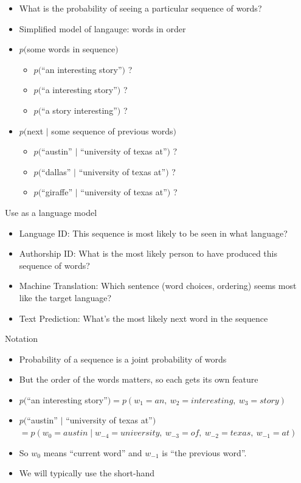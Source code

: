 \documentclass[11pt,letterpaper]{article}
\begin{document}
\begin{itemize}
  \item What is the probability of seeing a particular sequence of words?
  \item Simplified model of langauge: words in order
  \item $p($some words in sequence$)$
    \begin{itemize}
      \item $p($``an interesting story''$)$ ?
      \item $p($``a interesting story''$)$ ?
      \item $p($``a story interesting''$)$ ?
    \end{itemize}
  \item $p($next $\mid$ some sequence of previous words$)$
    \begin{itemize}
      \item $p($``austin'' $\mid$ ``university of texas at''$)$ ?
      \item $p($``dallas'' $\mid$ ``university of texas at''$)$ ?
      \item $p($``giraffe'' $\mid$ ``university of texas at''$)$ ?
    \end{itemize}
\end{itemize}

Use as a language model

\begin{itemize}
  \item Language ID: This sequence is most likely to be seen in what language?
  \item Authorship ID: What is the most likely person to have produced this sequence of words?
  \item Machine Translation: Which sentence (word choices, ordering) seems most like the target language?
  \item Text Prediction: What's the most likely next word in the sequence
\end{itemize}

Notation

\begin{itemize}
  \item Probability of a sequence is a joint probability of words
  \item But the order of the words matters, so each gets its own feature
  \item $p($``an interesting story''$) = p(w_1=an, ~ w_2=interesting, ~ w_3=story)$
  \item $p($``austin'' $\mid$ ``university of texas at''$)$\\
        $= p(w_{0}=austin \mid w_{-4}=university, ~ w_{-3}=of, ~ w_{-2}=texas, ~ w_{-1}=at)$
  \item So $w_0$ means ``current word'' and $w_{-1}$ is ``the previous word''.
  \item We will typically use the short-hand
\end{itemize}
\end{document}
